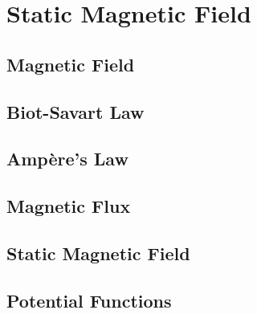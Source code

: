 \section{Static Magnetic Field}

\subsection{Magnetic Field}

\subsection{Biot-Savart Law}

\subsection{Ampère's Law}

\subsection{Magnetic Flux}

\subsection{Static Magnetic Field}

\subsection{Potential Functions}

